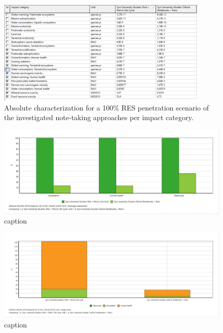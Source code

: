 \begin{figure}[H]
    \centering
    \includegraphics[width=0.9\textwidth]{images/RES_100/Characterization_Table_RES_100.PNG}
    \caption{Absolute characterization for a 100\% RES penetration scenario of the investigated note-taking approaches per impact category.}\label{fig:characterization_table_RES_100}
\end{figure}

\begin{figure}[H]
    \centering
    \includegraphics[width=\textwidth]{images/RES_100/Damage_Assessment_RES_100.JPG}
    \caption{caption}\label{fig:damage_assessment_RES_100}
\end{figure}

\begin{figure}[H]
    \centering
    \includegraphics[width=\textwidth]{images/RES_100/Single_Score_RES_100.JPG}
    \caption{caption}\label{fig:single_score_RES100}
\end{figure}